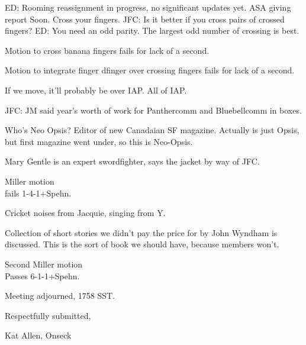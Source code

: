 \documentclass[10pt]{article}
\begin{document}
ED: Rooming reassignment in progress, no significant updates yet.  ASA
giving report Soon.  Cross your fingers.  JFC: Is it better if you
cross pairs of crossed fingers?  ED: You need an odd parity.  The
largest odd number of crossing is best.

Motion to cross banana fingers fails for lack of a second.

Motion to integrate finger dfinger over crossing fingers fails for
lack of a second.

If we move, it'll probably be over IAP.  All of IAP.

JFC: JM said year's worth of work for Panthercomm and Bluebellcomm in
boxes.  

Who's Neo Opsis?  Editor of new Canadaian SF magazine.  Actually is
just Opsis, but first magazine went under, so this is Neo-Opsis.

Mary Gentle is an expert swordfighter, says the jacket by way of JFC.

Miller motion\\
fails 1-4-1+Spehn.

Cricket noises from Jacquie, singing from Y.  

Collection of short stories we didn't pay the price for by John
Wyndham is discussed.  This is the sort of book we should have,
because members won't.

Second Miller motion\\
Passes 6-1-1+Spehn.

\vspace{12pt}

\noindent
Meeting adjourned, 1758 SST.

\vspace{18pt}

\centerline{Respectfully submitted,}
\centerline{Kat Allen,  Onseck}
\end{document}
